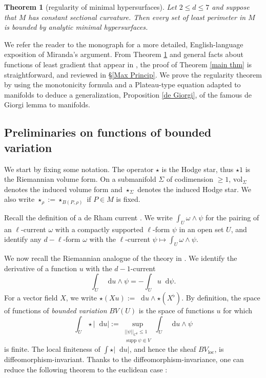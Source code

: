 \documentclass[reqno,10pt]{amsart}
\DeclareMathOperator{\supp}{supp}
\newcommand*\dif{\mathop{}\!\mathrm{d}}
\newcommand{\vol}{\mathrm{vol}}
\newcommand{\dfn}[1]{\emph{#1}\index{#1}}
\newcommand{\loc}{\mathrm{loc}}
\newtheorem{mainthm}{Theorem}
\theoremstyle{definition}
\numberwithin{equation}{section}
\begin{document}
\begin{mainthm}[regularity of minimal hypersurfaces]\label{main lma}
Let $2 \leq d \leq 7$ and suppose that $M$ has constant sectional curvature.
Then every set of least perimeter in $M$ is bounded by analytic minimal hypersurfaces.
\end{mainthm}

We refer the reader to the monograph \cite[Part 1]{Giusti77} for a more detailed, English-language exposition of Miranda's argument.
From Theorem \ref{main lma} and general facts about functions of least gradient that appear in \cite{Miranda67}, the proof of Theorem \ref{main thm} is straightforward, and reviewed in \S\ref{Max Princip}.
We prove the regularity theorem by using the monotonicity formula and a Plateau-type equation adapted to manifolds to deduce a generalization, Proposition \ref{de Giorgi}, of the famous de Giorgi lemma to manifolds.

\subsection{Preliminaries on functions of bounded variation}
We start by fixing some notation. The operator $\star$ is the Hodge star, thus $\star 1$ is the Riemannian volume form.
On a submanifold $\Sigma$ of codimension $\geq 1$, $\vol_\Sigma$ denotes the induced volume form and $\star_\Sigma$ denotes the induced Hodge star. We also write $\star_\rho := \star_{B(P, \rho)}$ if $P \in M$ is fixed.

Recall the definition of a de Rham current \cite{simon1983GMT}.
We write $\int_U \omega \wedge \psi$ for the pairing of an $\ell$-current $\omega$ with a compactly supported $\ell$-form $\psi$ in an open set $U$, and identify any $d - \ell$-form $\omega$ with the $\ell$-current $\psi \mapsto \int_U \omega \wedge \psi$.

We now recall the Riemannian analogue of the theory in \cite[Chapter 1]{Giusti77}.
We identify the derivative of a function $u$ with the $d-1$-current
$$\int_U \dif u \wedge \psi = -\int_U u \dif \psi.$$
For a vector field $X$, we write $\star (Xu) := \dif u \wedge \star (X^\flat)$.
By definition, the space of functions of \dfn{bounded variation} $BV(U)$ is the space of functions $u$ for which
\begin{equation}\label{total variation}
\int_U \star |\dif u| := \sup_{\substack{||\psi||_{C^0} \leq 1\\\supp \psi \Subset V}} \int_U \dif u \wedge \psi
\end{equation}
is finite.
The local finiteness of $\int \star |\dif u|$, and hence the sheaf $BV_\loc$, is diffeomorphism-invariant.
Thanks to the diffeomorphism-invariance, one can reduce the following theorem to the euclidean case \cite[Teorema 1]{Miranda67}:
\end{document}
